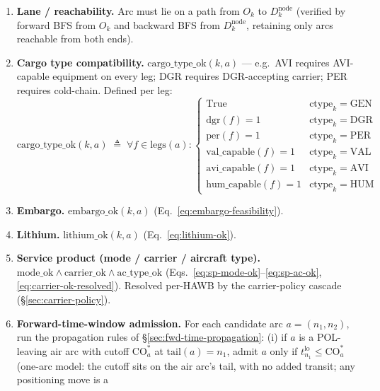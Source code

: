 \documentclass[11pt,a4paper]{article}
\newcommand{\defeq}{\triangleq}
\newcommand{\ctype}{\text{ctype}}
\theoremstyle{definition}
\begin{document}
\begin{enumerate}[noitemsep]
  \item \textbf{Lane / reachability.} Arc must lie on a path from $O_k$ to
        $D_k^{\text{node}}$ (verified by forward BFS from $O_k$ and backward
        BFS from $D_k^{\text{node}}$, retaining only arcs reachable from both
        ends).
  \item \textbf{Cargo type compatibility.} $\text{cargo\_type\_ok}(k, a)$ ---
        e.g.\ AVI requires AVI-capable equipment on every leg; DGR requires
        DGR-accepting carrier; PER requires cold-chain. Defined per leg:
        \begin{equation}
          \text{cargo\_type\_ok}(k, a) \;\defeq\;
            \forall f \in \text{legs}(a):
            \begin{cases}
              \text{True} & \ctype_k = \text{GEN} \\
              \text{dgr}(f) = 1 & \ctype_k = \text{DGR} \\
              \text{per}(f) = 1 & \ctype_k = \text{PER} \\
              \text{val\_capable}(f) = 1 & \ctype_k = \text{VAL} \\
              \text{avi\_capable}(f) = 1 & \ctype_k = \text{AVI} \\
              \text{hum\_capable}(f) = 1 & \ctype_k = \text{HUM}
            \end{cases}
          \label{eq:cargo-type-ok}
        \end{equation}
  \item \textbf{Embargo.} $\text{embargo\_ok}(k, a)$ (Eq.~\ref{eq:embargo-feasibility}).
  \item \textbf{Lithium.} $\text{lithium\_ok}(k, a)$ (Eq.~\ref{eq:lithium-ok}).
  \item \textbf{Service product (mode / carrier / aircraft type).}
        $\text{mode\_ok} \wedge \text{carrier\_ok} \wedge \text{ac\_type\_ok}$
        (Eqs.~\ref{eq:sp-mode-ok}--\ref{eq:sp-ac-ok},
        \ref{eq:carrier-ok-resolved}). Resolved per-HAWB by the carrier-policy
        cascade (\S\ref{sec:carrier-policy}).
  \item \textbf{Forward-time-window admission.} For each candidate arc $a =
        (n_1, n_2)$, run the propagation rules of
        \S\ref{sec:fwd-time-propagation}: (i) if $a$ is a POL-leaving air arc
        with cutoff $\text{CO}_a^*$ at $\text{tail}(a) = n_1$, admit $a$ only if
        $t^{\text{lo}}_{n_1} \leq \text{CO}_a^*$ (one-arc model: the cutoff sits
        on the air arc's tail, with no added transit; any positioning move is a

\end{enumerate}
\end{document}
